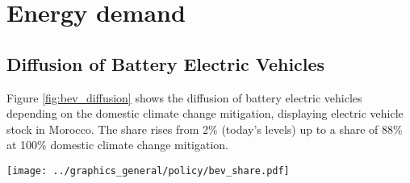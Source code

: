 

\section{Energy demand}

\subsection{Diffusion of Battery Electric Vehicles}
\label{subsec:bev_diffusion}
Figure \ref{fig:bev_diffusion} shows the diffusion of battery electric vehicles depending on the domestic climate change mitigation, displaying electric vehicle stock in Morocco. The share rises from 2\% (today's levels) up to a share of 88\% at 100\% domestic climate change mitigation. %

\begin{figure*}[h]
    \centering
    \texttt{[image: ../graphics\_general/policy/bev\_share.pdf]}
    \caption{Market diffusion of Battery Electricity Vehicles in Morocco, synthesized based on an s-curve with a growth rate $k=0.2$ and inflection point $x_0=2040$.}
    \label{fig:bev_diffusion}
\end{figure*}




\clearpage




\clearpage